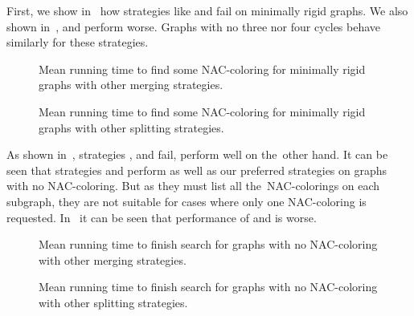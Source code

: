 First, we show in~
how strategies like \Log{} and \PromisingCycles{} fail on minimally rigid graphs.
We also shown in~,
\KernighanLin{} and \Cuts{} perform worse.
%
Graphs with no three nor four cycles behave similarly for these strategies.
%
\begin{figure}[thbp]
	\centering
	\scalebox{\BenchFigureScale}{}
	\caption[Other merging strategies for minimally rigid graphs]{
		Mean running time to find some NAC-coloring for minimally rigid graphs with other merging strategies.}%
	\label{fig:graph_mimimally_rigid_failing_merging_first_runtime}
\end{figure}%
\begin{figure}[thbp]
	\centering
	\scalebox{\BenchFigureScale}{}
	\caption[Other splitting strategies for minimally rigid graphs]{
		Mean running time to find some NAC-coloring for minimally rigid graphs with other splitting strategies.}%
	\label{fig:graph_mimimally_rigid_failing_split_first_runtime}
\end{figure}%


As shown in~,
strategies \Log{}, \SortedBits{} and \MinMax{} fail,
\PromisingCycles{} perform well on the~other hand.
%
It can be seen that strategies \SortedSize{} and \Score{} perform
as well as our preferred strategies on graphs with no NAC-coloring.
But as they must list all the~NAC-colorings on each subgraph,
they are not suitable for cases where only one NAC-coloring is requested.
%
In~
it can be seen that performance of \KernighanLin{} and \Cuts{} is worse.
%
\begin{figure}[thbp]
	\centering
	\scalebox{\BenchFigureScale}{}
	\caption[Other merging strategies for graphs with no NAC-coloring]{
		Mean running time to finish search for graphs with no NAC-coloring with other merging strategies.}%
	\label{fig:graph_no_nac_coloring_generated_rigid_failing_merging_first_runtime}
\end{figure}%
\begin{figure}[thbp]
	\centering
	\scalebox{\BenchFigureScale}{}
	\caption[Other splitting strategies for graphs with no NAC-coloring]{
		Mean running time to finish search for graphs with no NAC-coloring with other splitting strategies.}%
	\label{fig:graph_no_nac_coloring_generated_rigid_failing_split_first_runtime}
\end{figure}%


